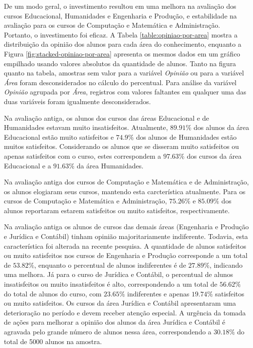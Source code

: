 \documentclass[10pt,a4paper,oneside]{article}
\newcommand{\adm}{Administração\xspace}
\newcommand{\comp}{Computação e Matemática\xspace}
\newcommand{\edu}{Educacional\xspace}
\newcommand{\eng}{Engenharia e Produção\xspace}
\newcommand{\hum}{Humanidades\xspace}
\newcommand{\jur}{Jurídica e Contábil\xspace}
\begin{document}
De um modo geral, o investimento resultou em uma melhora na avaliação dos cursos \edu, \hum e \eng, e estabilidade na avaliação para os cursos de \comp e \adm. Portanto, o investimento foi eficaz. A Tabela \ref{table:opiniao-por-area} mostra a distribuição da opinião dos alunos para cada área do conhecimento, enquanto a Figura \ref{fig:stacked-opiniao-por-area} apresenta os mesmos dados em um gráfico empilhado usando valores absolutos da quantidade de alunos. Tanto na figura quanto na tabela, amostras sem valor para a variável \textit{Opinião} ou para a variável \textit{Área} foram desconsiderados no cálculo do percentual. Para análise da variável \textit{Opinião} agrupada por \textit{Área}, registros com valores faltantes em qualquer uma das duas variáveis foram igualmente desconsiderados.

Na avaliação antiga, os alunos dos cursos das áreas \edu e de \hum estavam muito insatisfeitos. Atualmente, $89.91\%$ dos alunos da área \edu estão muito satisfeitos e $74.9\%$ dos alunos de \hum estão muitos satisfeitos. Considerando os alunos que se disseram muito satisfeitos ou apenas satisfeitos com o curso, estes correspondem a $97.63\%$ dos cursos da área \edu e a $91.63\%$ da área \hum.

Na avaliação antiga dos cursos de \comp e de \adm, os alunos elogiaram seus cursos, mantendo esta carcterística atualmente. Para os cursos de \comp e \adm, $75.26\%$ e $85.09\%$ dos alunos reportaram estarem satisfeitos ou muito satisfeitos, respectivamente.

Na avaliação antiga os alunos de cursos das demais áreas (\eng e \jur) tinham opinião majoritariamente indiferente. Todavia, esta característica foi alterada na recente pesquisa. A quantidade de alunos satisfeitos ou muito satisfeitos nos cursos de \eng corresponde a um total de $53.82\%$, enquanto o percentual de alunos indiferentes é de $27.89\%$, indicando uma melhora. Já para o curso de Jurídica e Contábil, o percentual de alunos insatisfeitos ou muito insatisfeitos é alto, correspondendo a um total de $56.62\%$ do total de alunos do curso, com $23.65\%$ indiferentes e apenas $19.74\%$ satisfeitos ou muito satisfeitos. Os cursos da área  \jur apresentaram uma deterioração no período e devem receber atenção especial. A urgência da tomada de ações para melhorar a opinião dos alunos da área \jur é agravada pelo grande número de alunos nessa área, correspondendo a  $30.18\%$ do total de 5000 alunos na amostra.
\end{document}
